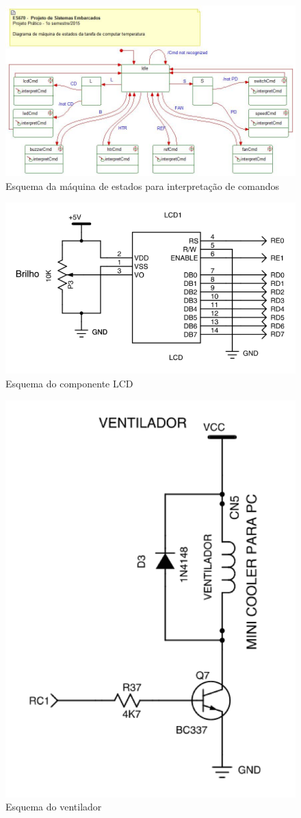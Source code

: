 \documentclass{article}
\begin{document}
\begin{figure}[H]
	\centering
	\includegraphics[width=0.9\linewidth]{maquina}
	\caption{Esquema da máquina de estados para interpretação de comandos}
	\label{fig:maquina}
\end{figure}
\begin{figure}[H]
	\centering
	\includegraphics[width=0.9\linewidth]{esq_lcd}
	\caption{Esquema do componente LCD}
	\label{fig:esq_lcd}
\end{figure}
\begin{figure}[H]
	\centering
	\includegraphics[width=0.5\linewidth]{esq_cooler}
	\caption{Esquema do ventilador}
	\label{fig:esq_cooler}
\end{figure}
\end{document}
